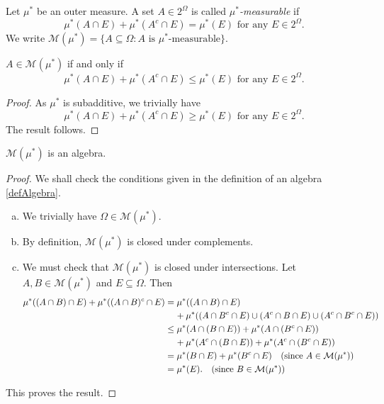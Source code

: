 \begin{definition}
    Let $\mu^*$ be an outer measure. A set $A\in 2^\Omega$ is called \textit{$\mu^*$-measurable} if
    $$\mu^*(A\cap E) + \mu^*(A^c\cap E) = \mu^*(E)\text{ for any }E\in 2^\Omega.$$
    We write $\mathcal{M}(\mu^*)=\{A\subseteq\Omega:A\text{ is }\mu^*\text{-measurable}\}.$
\end{definition}

\begin{lemma}
\label{mu measurable iff leq}
    $A\in\mathcal{M}(\mu^*)$ if and only if
    $$\mu^*(A\cap E) + \mu^*(A^c\cap E) \leq \mu^*(E)\text{ for any }E\in 2^\Omega.$$
\end{lemma}
\begin{proof}
    As $\mu^*$ is subadditive, we trivially have
    $$\mu^*(A\cap E) + \mu^*(A^c\cap E) \geq \mu^*(E)\text{ for any }E\in 2^\Omega.$$
    The result follows.
\end{proof}

\begin{lemma}
    $\mathcal{M}(\mu^*)$ is an algebra.
\end{lemma}
\begin{proof}
    We shall check the conditions given in the definition of an algebra \ref{defAlgebra}.
    \begin{enumerate}[(a)]
        \item We trivially have $\Omega\in\mathcal{M}(\mu^*)$.
        \item By definition, $\mathcal{M}(\mu^*)$ is closed under complements.
        \item We must check that $\mathcal{M}(\mu^*)$ is closed under intersections. Let $A,B\in\mathcal{M}(\mu^*)$ and $E\subseteq\Omega$. Then
        \begin{align*}
            \mu^*((A\cap B)\cap E)+\mu^*((A\cap B)^c\cap E) &= \mu^*((A\cap B)\cap E) \\ &\hspace{4mm}+\mu^*((A\cap B^c\cap E)\cup(A^c\cap B\cap E)\cup(A^c\cap B^c\cap E)) \\
            &\leq \mu^*(A\cap (B\cap E))+\mu^*(A\cap (B^c\cap E))\\ &\hspace{4mm}+\mu^*(A^c\cap (B\cap E)) + \mu^*(A^c\cap (B^c\cap E)) \\
            &= \mu^*(B\cap E) + \mu^*(B^c\cap E)\quad\text{(since $A\in\mathcal{M}(\mu^*)$)} \\
            &= \mu^*(E). \quad\text{(since $B\in\mathcal{M}(\mu^*)$)}
        \end{align*}
    \end{enumerate}
    This proves the result.
\end{proof}

